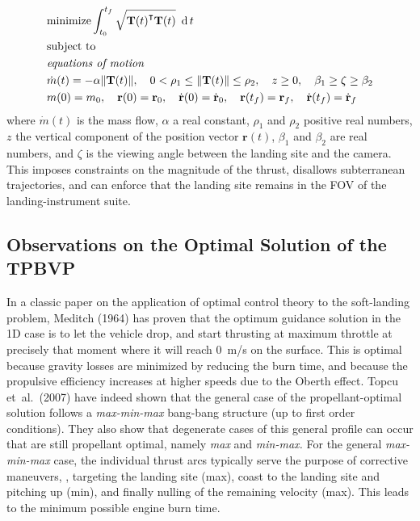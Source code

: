 \documentclass[%
]{aiaa-tc}
\begin{document}
\begin{align}
    \begin{split}
        & \text{minimize} \int_{t_0}^{t_f}
        \sqrt{{\mathbf{T}(t)}^{\intercal}\mathbf{T}(t)}\ \operatorname{d} t\\
        & \text{subject to }\\
        & \text{\emph{equations of motion}}\\
        & \dot{m}(t) = -\alpha
        \lVert\mathbf{T}(t)\rVert, \quad
        0<\rho_1\leq  \lVert\mathbf{T}(t)\rVert \leq \rho_2, \quad z\geq 0,\quad
            \beta_1 \geq \zeta \geq \beta_2 \\
        & m(0) = m_0,\quad \mathbf{r}(0) = \mathbf{r}_0, \quad
        \dot{\mathbf{r}}(0) = \dot{\mathbf{r}}_0,\quad \mathbf{r}(t_f) =
        \mathbf{r}_f,\quad \dot{\mathbf{r}}(t_f) = \dot{\mathbf{r}}_f
        \label{eq:equality}  
    \end{split}
\end{align}
\noindent where $ \dot{m}(t)$ is the mass flow, $\alpha$ a real constant,
$\rho_1$ and $\rho_2$ positive real numbers, $z$ the vertical component of the
position vector $\mathbf{r}(t)$, $\beta_1$ and $\beta_2$ are real numbers, and
$\zeta$ is the viewing angle between the landing site and the camera. This
imposes constraints on the magnitude of the thrust, disallows subterranean
trajectories, and can enforce that the landing site remains in the FOV of the
landing-instrument suite.


\subsection{Observations on the Optimal Solution of the TPBVP}
\label{sec:observations}

In a classic paper on the application of optimal control theory to the
soft-landing problem, Meditch (1964) has proven that the optimum guidance
solution in the 1D case is to let the vehicle drop, and start thrusting at
maximum throttle at precisely that moment where it will reach \SI{0}{m/s} on the
surface.\cite{Meditch1964} This is optimal because gravity losses are minimized
by reducing the burn time, and because the propulsive efficiency increases at
higher speeds due to the Oberth effect. Topcu et~al.~(2007) have indeed shown
that the general case of the propellant-optimal solution follows a
\emph{max-min-max} bang-bang structure (up to first order
conditions).\cite{Topcu2005,Topcu2007} They also show that degenerate cases of
this general profile can occur that are still propellant optimal, namely
\emph{max} and \emph{min-max.} For the general \emph{max-min-max} case, the
individual thrust arcs typically serve the purpose of corrective maneuvers, \eg,
targeting the landing site (max), coast to the landing site and pitching up
(min), and finally nulling of the remaining velocity (max). This leads to the
minimum possible engine burn time.
\end{document}
